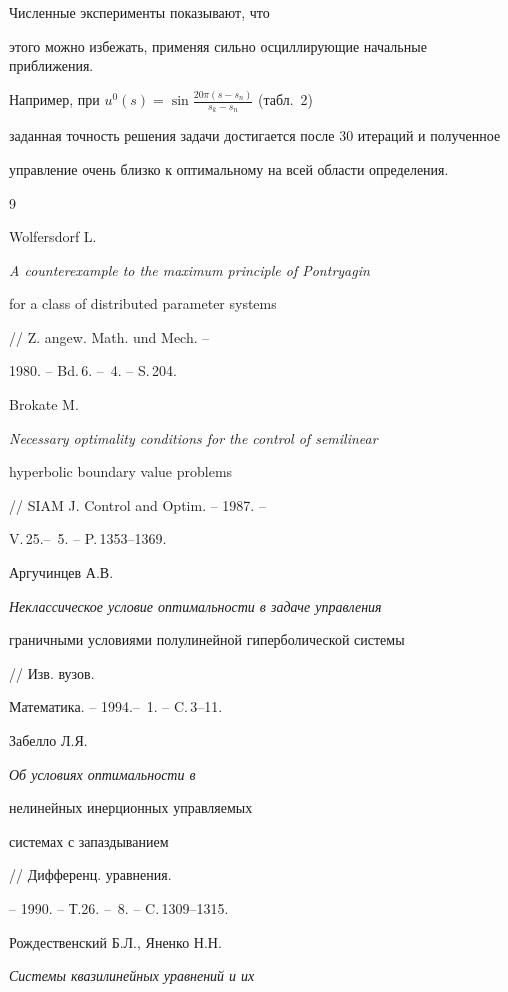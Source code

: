 \smallskip





Численные эксперименты показывают, что


этого можно избежать, применяя сильно осциллирующие начальные приближения.


Например, при $u^0(s)=\sin \frac{20\pi (s-s_n)}{s_k-s_n}$ (табл.~2) 


заданная точность решения задачи достигается после 30 итераций и полученное 


управление очень близко к оптимальному на всей области определения. 





\begin{thebibliography}{9}







Wolfersdorf L. {\it A counterexample to the maximum principle of Pontryagin


for a class of distributed parameter systems} // Z. angew. Math. und Mech. --


1980. -- Bd.\,6. -- \No\,4. -- S.\,204.




Brokate M. {\it Necessary optimality conditions for the control of semilinear


hyperbolic boundary value problems} // SIAM J. Control and Optim. -- 1987. --


V.\,25.-- \No\,5. -- P.\,1353--1369.




Аргучинцев А.В. {\it Неклассическое условие оптимальности в задаче управления 


граничными условиями полулинейной гиперболической системы} // Изв. вузов.


Математика. -- 1994.-- \No\,1. -- C.\,3--11.




Забелло Л.Я. {\it Об условиях оптимальности в 


нелинейных инерционных управляемых 


системах с запаздыванием} // Дифференц. уравнения.


-- 1990. -- Т.26. -- \No\,8. -- C.\,1309--1315.




Рождественский Б.Л., Яненко Н.Н. {\it Системы квазилинейных уравнений и их 


}
\end{thebibliography}
